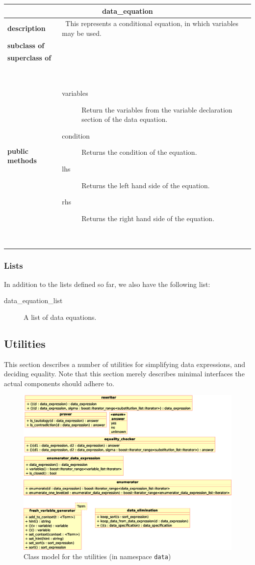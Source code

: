\documentclass[a4paper,11pt]{article}
\newcommand{\dataclass}[5]{
\begin{flushleft}
\begin{longtable}{p{3cm} p{11cm}}
\multicolumn{2}{c}{\textbf{#1}}\\\hline\hline
\textbf{description} & ~#2~ \\\hline
\textbf{subclass of} & ~#3~ \\\hline
\textbf{superclass of} & ~#4~ \\\hline
\textbf{public methods} & ~#5~ \\\hline
\end{longtable}
\end{flushleft}
}
\begin{document}
\dataclass
  {data\_equation}
  {This represents a conditional equation, in which variables may be used.}
  {}
  {}
  {\begin{description}
    \item[variables] Return the variables from the variable declaration section of the data equation.
    \item[condition] Returns the condition of the equation.
    \item[lhs] Returns the left hand side of the equation.
    \item[rhs] Returns the right hand side of the equation.
   \end{description}}

\subsubsection{Lists}
In addition to the lists defined so far, we also have the following list:
\begin{description}
 \item[data\_equation\_list] A list of data equations.
\end{description}

\FloatBarrier
\subsection{Utilities}
This section describes a number of utilities for simplifying data expressions, and deciding equality. Note that this section merely describes minimal interfaces the actual components should adhere to.

\begin{figure}[htp]
    \begin{center}
      \includegraphics[width=\textwidth]{utilities}
      \caption{Class model for the utilities (in namespace \texttt{data})}
      \label{fig:class_utilities}
    \end{center}
  \end{figure}
\end{document}
